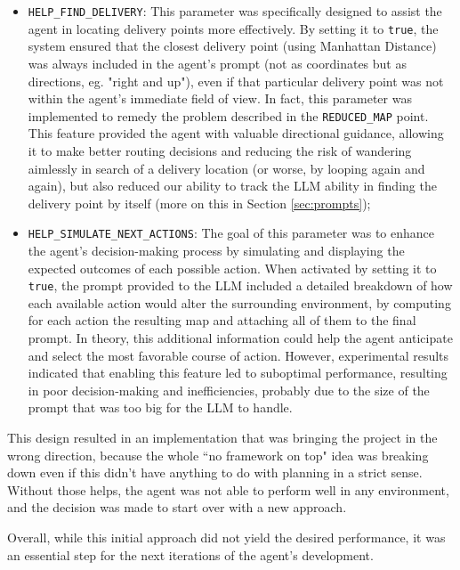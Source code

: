 \begin{itemize}
  \item \texttt{HELP\_FIND\_DELIVERY}: This parameter was specifically designed to
    assist the agent in locating delivery points more effectively. By setting it
    to \texttt{true}, the system ensured that the closest delivery point (using Manhattan
    Distance) was always included in the agent's prompt (not as coordinates but as
    directions, eg. "right and up"), even if that particular delivery point was not
    within the agent's immediate field of view. In fact, this parameter was implemented
    to remedy the problem described in the \texttt{REDUCED\_MAP} point. This feature
    provided the agent with valuable directional guidance, allowing it to make
    better routing decisions and reducing the risk of wandering aimlessly in
    search of a delivery location (or worse, by looping again and again), but
    also reduced our ability to track the LLM ability in finding the delivery
    point by itself (more on this in Section \ref{sec:prompts});

  \item \texttt{HELP\_SIMULATE\_NEXT\_ACTIONS}: The goal of this parameter was to
    enhance the agent's decision-making process by simulating and displaying the
    expected outcomes of each possible action. When activated by setting it to
    \texttt{true}, the prompt provided to the LLM included a detailed breakdown
    of how each available action would alter the surrounding environment, by computing
    for each action the resulting map and attaching all of them to the final prompt.
    In theory, this additional information could help the agent anticipate and select
    the most favorable course of action. However, experimental results indicated
    that enabling this feature led to suboptimal performance, resulting in poor
    decision-making and inefficiencies, probably due to the size of the prompt that
    was too big for the LLM to handle.
\end{itemize}

This design resulted in an implementation that was bringing the project in the
wrong direction, because the whole ``no framework on top" idea was breaking down
even if this didn't have anything to do with planning in a strict sense. Without
those helps, the agent was not able to perform well in any environment, and the decision
was made to start over with a new approach.

Overall, while this initial approach did not yield the desired performance, it was
an essential step for the next iterations of the agent's development.

